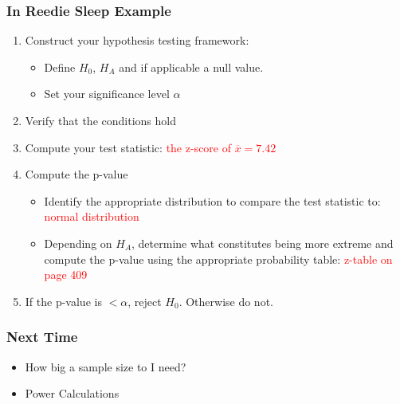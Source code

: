 \documentclass[handout]{beamer}
\newcommand{\blue}[1]{\textcolor{blue2}{#1}}
\newcommand{\xbar}{\overline{x}}
\begin{document}
\begin{frame}
\frametitle{In Reedie Sleep Example}
\begin{enumerate}
\pause\item Construct your hypothesis testing framework:
\begin{itemize}
\item Define $H_0$, $H_A$ and if applicable a null value.
\item Set your significance level $\alpha$
\end{itemize}
\pause\item Verify that the conditions hold
\pause\item Compute your \blue{test statistic}: \textcolor{red}{the z-score of $\xbar=7.42$}
\pause\item Compute the p-value
\begin{itemize}
\item Identify the appropriate distribution to compare the test statistic to:  \textcolor{red}{normal distribution}
\item Depending on $H_A$, determine what constitutes being \blue{more extreme} and compute the p-value using the appropriate probability table: \textcolor{red}{z-table on page 409}
\end{itemize}
\pause\item If the p-value is $<\alpha$, reject $H_0$.  Otherwise do not.
\end{enumerate}

\end{frame}


\begin{frame}[fragile]
\frametitle{Next Time}

\begin{itemize}
\item How big a sample size to I need?
\item Power Calculations
\end{itemize}

\end{frame}
\end{document}
